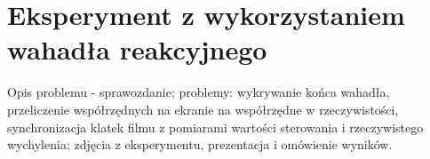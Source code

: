 \chapter{Eksperyment z wykorzystaniem wahadła reakcyjnego}
\label{cha:reakcyjne}
Opis problemu - sprawozdanie; problemy: wykrywanie końca wahadła, przeliczenie współrzędnych na ekranie na współrzędne w rzeczywistości, synchronizacja klatek filmu z pomiarami wartości sterowania i rzeczywistego wychylenia; zdjęcia z eksperymentu, prezentacja i omówienie wyników.